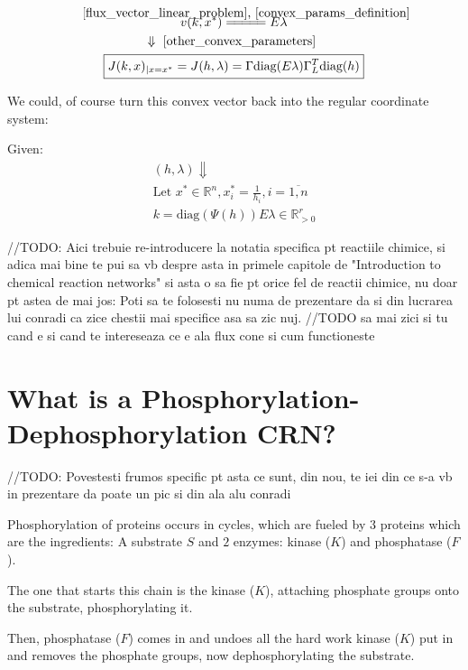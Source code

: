 \begin{gather}\label{jacobian_convex_params}
	v(k, x^*) \eqCuzConvex E \lambda  \notag \\
	\Downarrow \text{ \ref{other_convex_parameters} } \notag \\
	\boxed{J(k,x)_{|x=x^{*}}=J(h,\lambda)=\Gamma \text{diag}(E\lambda)\Gamma_{L}^{T}\text{diag}(h)}
\end{gather}

We could, of course turn this convex vector back into the regular coordinate system:

Given:
\begin{gather*}
	(h,\lambda) \Downarrow \\
	\text{Let  } x^* \in \mathbb{R}^n , \boxed{
		x^*_i = \frac{1}{h_i} , i = \overline{1,n}
	} \\
	\boxed{
		k = \text{diag}(\Psi(h)) E \lambda \in \mathbb{R}^r_{> 0}
 }
\end{gather*}

\hfill\break
//TODO: Aici trebuie re-introducere la notatia specifica pt reactiile chimice, si adica mai bine te pui sa vb despre asta in primele capitole de "Introduction to chemical reaction networks"
si asta o sa fie pt orice fel de reactii chimice, nu doar pt astea de mai jos:
Poti sa te folosesti nu numa de prezentare da si din lucrarea lui conradi ca zice chestii mai specifice asa sa zic nuj.
//TODO sa mai zici si tu cand e si cand te intereseaza ce e ala flux cone si cum functioneste
\hfill\break

\section{What is a Phosphorylation-Dephosphorylation CRN?}

\hfill\break
//TODO: Povestesti frumos specific pt asta ce sunt, din nou, te iei din ce s-a vb in prezentare da poate un pic si din ala alu conradi
\hfill\break

Phosphorylation of proteins occurs in cycles, which are fueled by $3$ proteins which are the ingredients: A substrate $S$ and $2$ enzymes: kinase ($K$) and phosphatase ($F$).

The one that starts this chain is the kinase ($K$), attaching phosphate groups onto the substrate, phosphorylating it.

Then, phosphatase ($F$) comes in and undoes all the hard work kinase ($K$) put in and removes the phosphate groups, now dephosphorylating the substrate.

